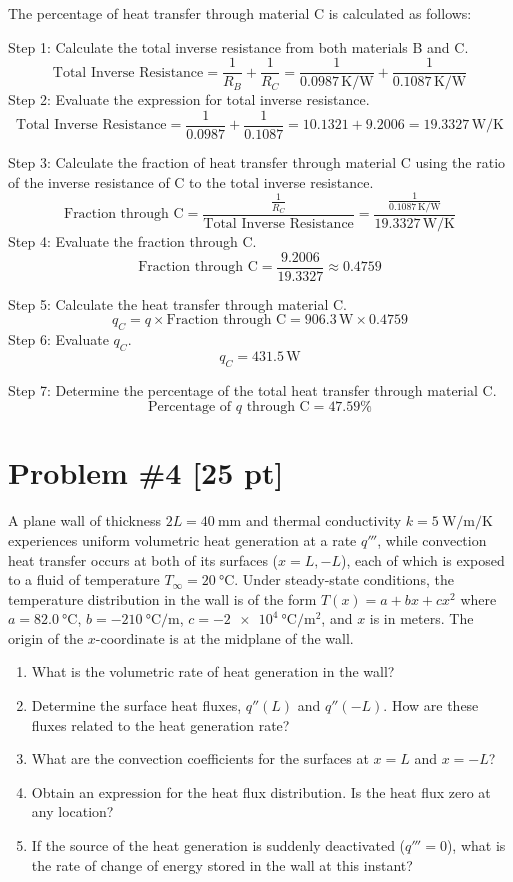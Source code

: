 \documentclass{article}
\begin{document}
\noindent
The percentage of heat transfer through material C is calculated as follows:

Step 1: Calculate the total inverse resistance from both materials B and C.
\[
\text{Total Inverse Resistance} = \frac{1}{R_B} + \frac{1}{R_C} = \frac{1}{0.0987 \, \text{K/W}} + \frac{1}{0.1087 \, \text{K/W}}
\]
Step 2: Evaluate the expression for total inverse resistance.
\[
\text{Total Inverse Resistance} = \frac{1}{0.0987} + \frac{1}{0.1087} = 10.1321 + 9.2006 = 19.3327 \, \text{W/K}
\]

Step 3: Calculate the fraction of heat transfer through material C using the ratio of the inverse resistance of C to the total inverse resistance.
\[
\text{Fraction through C} = \frac{\frac{1}{R_C}}{\text{Total Inverse Resistance}} = \frac{\frac{1}{0.1087 \, \text{K/W}}}{19.3327 \, \text{W/K}}
\]
Step 4: Evaluate the fraction through C.
\[
\text{Fraction through C} = \frac{9.2006}{19.3327} \approx 0.4759
\]

Step 5: Calculate the heat transfer through material C.
\[
q_C = q \times \text{Fraction through C} = 906.3 \, \text{W} \times 0.4759
\]
Step 6: Evaluate \(q_C\).
\[
q_C = 431.5 \, \text{W}
\]

Step 7: Determine the percentage of the total heat transfer through material C.
\[
\text{Percentage of } q \text{ through C} = 47.59\%
\]




\newpage
\section{Problem \#4 [25 pt]}
A plane wall of thickness \(2L = \SI{40}{\milli\meter}\) and thermal conductivity \(k = \SI{5}{\watt\per\meter\per\kelvin}\) experiences uniform volumetric heat generation at a rate \(q'''\), while convection heat transfer occurs at both of its surfaces (\(x = L, -L\)), each of which is exposed to a fluid of temperature \(T_{\infty} = \SI{20}{\degreeCelsius}\). Under steady-state conditions, the temperature distribution in the wall is of the form \(T(x) = a + bx + cx^2\) where \(a = \SI{82.0}{\degreeCelsius}\), \(b = \SI{-210}{\degreeCelsius\per\meter}\), \(c = \SI{-2e4}{\degreeCelsius\per\meter\squared}\), and \(x\) is in meters. The origin of the \(x\)-coordinate is at the midplane of the wall.

\begin{enumerate}
    \item[(a)] What is the volumetric rate of heat generation in the wall?
    \item[(b)] Determine the surface heat fluxes, \(q''(L)\) and \(q''(-L)\). How are these fluxes related to the heat generation rate?
    \item[(c)] What are the convection coefficients for the surfaces at \(x=L\) and \(x=-L\)?
    \item[(d)] Obtain an expression for the heat flux distribution. Is the heat flux zero at any location?
    \item[(e)] If the source of the heat generation is suddenly deactivated (\(q''' = 0\)), what is the rate of change of energy stored in the wall at this instant?
\end{enumerate}
\end{document}
